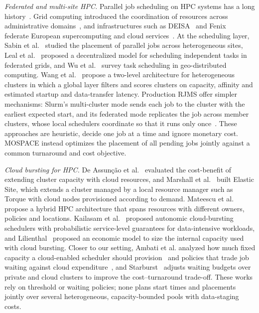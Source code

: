 \documentclass[conference]{IEEEtran}
\begin{document}
\emph{Federated and multi-site HPC.}
Parallel job scheduling on HPC systems has a long history~\cite{Feitelson2005}. Grid computing introduced the coordination of resources across administrative domains~\cite{Foster2001}, and infrastructures such as DEISA~\cite{Gentzsch2011} and Fenix~\cite{Alam2022} federate European supercomputing and cloud services~\cite{Haus2022}. At the scheduling layer, Sabin et al.~\cite{Sabin2003} studied the placement of parallel jobs across heterogeneous sites, Leal et al.~\cite{Leal2009} proposed a decentralized model for scheduling independent tasks in federated grids, and Wu et al.~\cite{Wu2025} survey task scheduling in geo-distributed computing. Wang et al.~\cite{Wang2025Efficient} propose a two-level architecture for heterogeneous clusters in which a global layer filters and scores clusters on capacity, affinity and estimated startup and data-transfer latency. Production RJMS offer simpler mechanisms: Slurm's multi-cluster mode sends each job to the cluster with the earliest expected start, and its federated mode replicates the job across member clusters, whose local schedulers coordinate so that it runs only once~\cite{Yoo2003,Jette2023}. These approaches are heuristic, decide one job at a time and ignore monetary cost. MOSPACE instead optimizes the placement of all pending jobs jointly against a common turnaround and cost objective.

\emph{Cloud bursting for HPC.}
De Assun\c{c}\~ao et al.~\cite{deAssuncao2009} evaluated the cost-benefit of extending cluster capacity with cloud resources, and Marshall et al.~\cite{Marshall2010} built Elastic Site, which extends a cluster managed by a local resource manager such as Torque with cloud nodes provisioned according to demand. Mateescu et al.~\cite{Mateescu2011} propose a hybrid HPC architecture that spans resources with different owners, policies and locations. Kailasam et al.~\cite{kailasam2010} proposed autonomic cloud-bursting schedulers with probabilistic service-level guarantees for data-intensive workloads, and Lilienthal~\cite{Lilienthal2013} proposed an economic model to size the internal capacity used with cloud bursting. Closer to our setting, Ambati et al. analyzed how much fixed capacity a cloud-enabled scheduler should provision~\cite{ambati2020waiting} and policies that trade job waiting against cloud expenditure~\cite{ambati2021good}, and Starburst~\cite{Luo24} adjusts waiting budgets over private and cloud clusters to improve the cost--turnaround trade-off. These works rely on threshold or waiting policies; none plans start times and placements jointly over several heterogeneous, capacity-bounded pools with data-staging costs.
\end{document}
